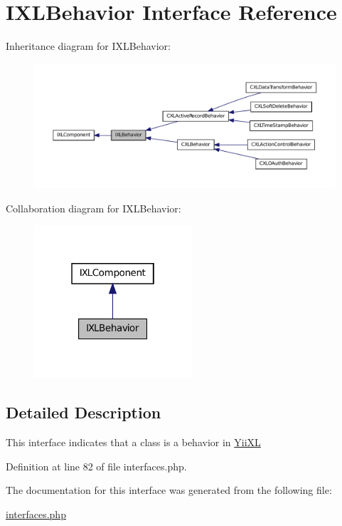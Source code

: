 \hypertarget{interfaceIXLBehavior}{
\section{IXLBehavior Interface Reference}
\label{interfaceIXLBehavior}
}


Inheritance diagram for IXLBehavior:\nopagebreak
\begin{figure}[H]
\begin{center}
\leavevmode
\includegraphics[width=400pt]{interfaceIXLBehavior__inherit__graph}
\end{center}
\end{figure}


Collaboration diagram for IXLBehavior:\nopagebreak
\begin{figure}[H]
\begin{center}
\leavevmode
\includegraphics[width=166pt]{interfaceIXLBehavior__coll__graph}
\end{center}
\end{figure}


\subsection{Detailed Description}
This interface indicates that a class is a behavior in \hyperlink{classYiiXL}{YiiXL} 

Definition at line 82 of file interfaces.php.



The documentation for this interface was generated from the following file:\begin{DoxyCompactItemize}
\item 
\hyperlink{interfaces_8php}{interfaces.php}\end{DoxyCompactItemize}
